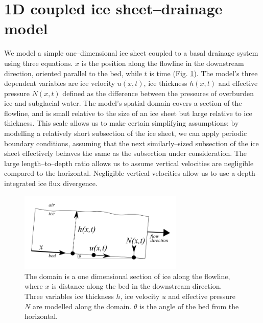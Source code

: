 \documentclass[journal abbreviation, manuscript]{copernicus}
\begin{document}
\section{1D coupled ice sheet--drainage model}


We model a simple one--dimensional ice sheet coupled to a basal drainage system using three equations. $x$ is the  position along the flowline in the downstream direction, oriented parallel to the bed, while $t$ is time (Fig. \ref{fig:domain}). The model's three dependent variables are ice velocity $u(x,t)$, ice thickness $h(x,t)$ and 
effective pressure $N(x,t)$ defined as the difference between the pressures of overburden ice and subglacial water.    
The model's spatial domain covers a section of the flowline, and is small relative to the size of an ice sheet but large relative to ice thickness. This scale allows us to make certain simplifying assumptions:
by modelling a relatively short subsection of the ice sheet, we can apply periodic 
boundary conditions, assuming that the next similarly--sized subsection of 
the ice sheet effectively behaves the same as the subsection under
consideration.
The large length--to--depth ratio allows us to assume vertical velocities are negligible compared to the horizontal. Negligible vertical velocities allow us to use a depth--integrated ice flux divergence.


\begin{figure}[hbt!]
\centering
\includegraphics[width=0.7\textwidth]{pictures/domain.png}
\caption[Schematic of the model domain]{The domain is a one dimensional section of ice along the flowline, where $x$ is distance along the bed in the downstream direction. Three variables ice thickness $h$, ice velocity $u$ and effective pressure $N$ are modelled along the domain. $\theta$ is the angle of the bed from the horizontal.}
\label{fig:domain}
\end{figure}
\end{document}
